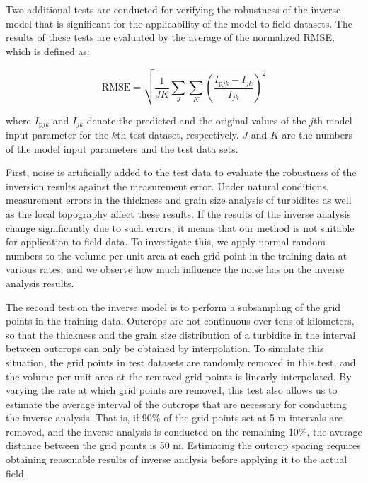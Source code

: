 Two additional tests are conducted for verifying the robustness of the inverse model that is significant for the applicability of the model to field datasets. The results of these tests are evaluated by the average of the normalized RMSE, which is defined as:

\begin{equation}
  \mathrm{RMSE} = \sqrt{ \frac{1}{JK} \sum_J \sum_K {\left( \frac{I_{\mathrm{p}jk} - I_{jk}}{I_{jk}} \right)^2} }
  \label{eq:RMSE}
\end{equation}

\noindent where $I_{\mathrm{p}jk}$ and $I_{jk}$ denote the predicted and the original values of the $j$th model input parameter for the $k$th test dataset, respectively. $J$ and $K$ are the numbers of the model input parameters and the test data sets.

First, noise is artificially added to the test data to evaluate the robustness of the inversion results against the measurement error. Under natural conditions, measurement errors in the thickness and grain size analysis of turbidites as well as the local topography  affect these results. If the results of the inverse analysis change significantly due to such errors, it means that our method is not suitable for application to field data. To investigate this, we apply normal random numbers to the volume per unit area at each grid point in the training data at various rates, and we observe how much influence the noise has on the inverse analysis results.

The second test on the inverse model is to perform a subsampling of the grid points in the training data. Outcrops are not continuous over tens of kilometers, so that the thickness and the grain size distribution of a turbidite in the interval between outcrops can only be obtained by interpolation. To simulate this situation, the grid points in test datasets are randomly removed in this test, and the volume-per-unit-area at the removed grid points is linearly interpolated. By varying the rate at which grid points are removed, this test also allows us to estimate the average interval of the outcrops that are necessary for conducting the inverse analysis. That is, if 90\% of the grid points set at 5 m intervals are removed, and the inverse analysis is conducted on the remaining 10\%, the average distance between the grid points is 50 m. Estimating the outcrop spacing requires obtaining reasonable results of inverse analysis before applying it to the actual field.